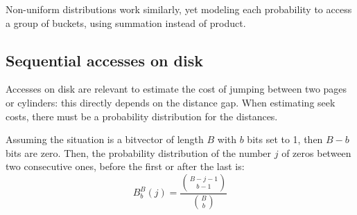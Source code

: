 Non-uniform distributions work similarly, yet modeling each probability to access a group of buckets, using summation instead of product. 

\subsection{Sequential accesses on disk}
Accesses on disk are relevant to estimate the cost of jumping between two pages or cylinders: this directly depends on the distance gap. When estimating seek costs, there must be a probability distribution for the distances.  

Assuming the situation is a bitvector of length $B$ with $b$ bits set to 1, then $B - b$ bits are zero. Then, the probability distribution of the number $j$ of zeros between two consecutive ones, before the first or after the last is:
$$B^B_b(j) = \frac{{B-j-1\choose b-1}}{{B\choose b}}$$